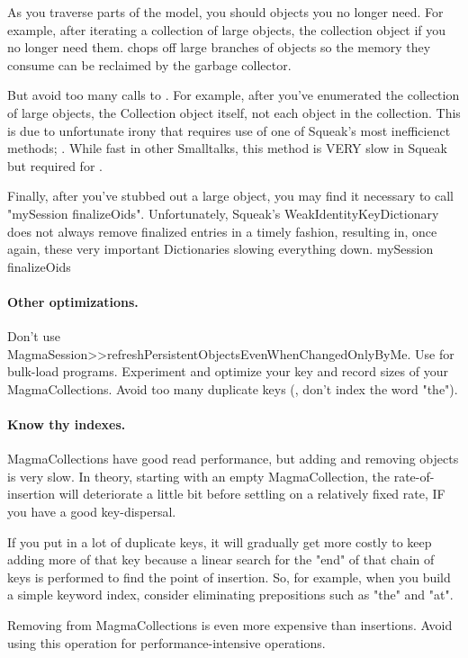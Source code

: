 \documentclass[a4paper,10pt,twoside]{book}
\begin{document}
As you traverse parts of the model, you should  objects you no longer need. For example, after iterating a collection of large objects,  the collection object if you no longer need them.  chops off large branches of objects so the memory they consume can be reclaimed by the garbage collector.

But avoid too many calls to . For example, after you've enumerated the collection of large objects,  the Collection object itself, not each object in the collection. This is due to unfortunate irony that  requires use of one of Squeak's most inefficienct methods; . While fast in other Smalltalks, this method is VERY slow in Squeak but required for .

Finally, after you've stubbed out a large object, you may find it necessary to call "mySession finalizeOids". Unfortunately, Squeak's WeakIdentityKeyDictionary does not always remove finalized entries in a timely fashion, resulting in, once again, these very important Dictionaries slowing everything down.
 mySession finalizeOids

\paragraph{Other optimizations.}

Don't use MagmaSession>>refreshPersistentObjectsEvenWhenChangedOnlyByMe.
Use  for bulk-load programs. Experiment and optimize your key and record sizes of your MagmaCollections. Avoid too many duplicate keys (\eg, don't index the word "the").


\paragraph{Know thy indexes.}
MagmaCollections have good read performance, but adding and removing objects is very slow. In theory, starting with an empty MagmaCollection, the rate-of-insertion will deteriorate a little bit before settling on a relatively fixed rate, IF you have a good key-dispersal.

If you put in a lot of duplicate keys, it will gradually get more costly to keep adding more of that key because a linear search for the "end" of that chain of keys is performed to find the point of insertion. So, for example, when you build a simple keyword index, consider eliminating prepositions such as "the" and "at".

Removing from MagmaCollections is even more expensive than insertions. Avoid using this operation for performance-intensive operations.











\ifx\wholebook\relax\else
\end{document}
